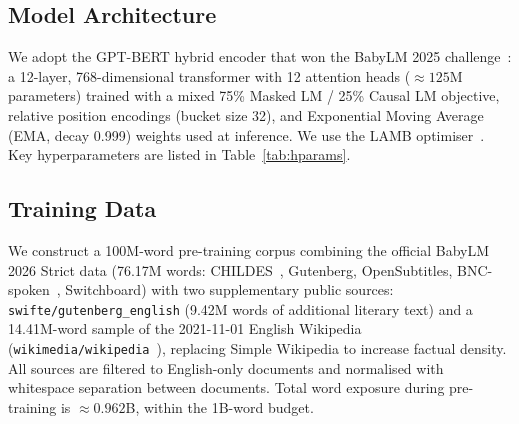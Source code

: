 \documentclass[11pt]{article}
\begin{document}
\subsection{Model Architecture}

We adopt the GPT-BERT hybrid encoder that won the BabyLM 2025
challenge~\citep{charpentier-etal-2025-findings}: a 12-layer, 768-dimensional
transformer with 12 attention heads (${\approx}125$M parameters) trained
with a mixed 75\% Masked LM / 25\% Causal LM objective,
relative position encodings (bucket size 32),
and Exponential Moving Average (EMA, decay 0.999) weights used at
inference. We use the LAMB optimiser~\citep{you-etal-2019-lamb}.
Key hyperparameters are listed in Table~\ref{tab:hparams}.

\begin{table}[t]
\centering
\small
{}
\caption{Pre-training hyperparameters. Seq curr.\ = sequence-length curriculum
(128 tokens for steps 0--80\%, 256 tokens for steps 80--100\%).}
\label{tab:hparams}
\end{table}

\subsection{Training Data}

We construct a 100M-word pre-training corpus combining
the official BabyLM 2026 Strict data (76.17M words: CHILDES~\citep{macwhinney-2000},
Gutenberg, OpenSubtitles, BNC-spoken~\citep{burnard-2007-bnc}, Switchboard)
with two supplementary public sources:
\texttt{swifte/gutenberg\_english} (9.42M words of additional
literary text) and a 14.41M-word sample of the 2021-11-01 English Wikipedia
(\texttt{wikimedia/wikipedia}~\citep{wikimedia-wikipedia-2023}),
replacing Simple Wikipedia to increase factual density.
All sources are filtered to English-only documents and
normalised with whitespace separation between documents.
Total word exposure during pre-training is ${\approx}0.962$B,
within the 1B-word budget.
\end{document}
